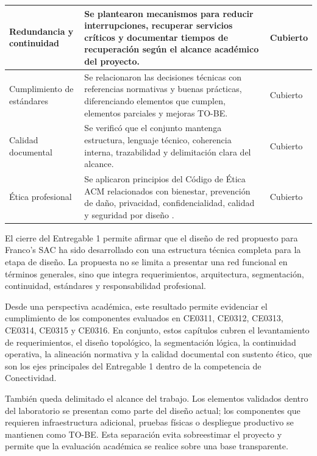 \documentclass[11pt, a4paper, oneside]{report}
\begin{document}
\begin{xltabular}{\textwidth}{@{}|L{3.5cm}|X|L{2.4cm}|@{}}
{\small Redundancia y continuidad} &
{\small Se plantearon mecanismos para reducir interrupciones, recuperar servicios críticos y documentar tiempos de recuperación según el alcance académico del proyecto.} &
{\small Cubierto} \\ \hline

{\small Cumplimiento de estándares} &
{\small Se relacionaron las decisiones técnicas con referencias normativas y buenas prácticas, diferenciando elementos que cumplen, elementos parciales y mejoras TO-BE.} &
{\small Cubierto} \\ \hline

{\small Calidad documental} &
{\small Se verificó que el conjunto mantenga estructura, lenguaje técnico, coherencia interna, trazabilidad y delimitación clara del alcance.} &
{\small Cubierto} \\ \hline

{\small Ética profesional} &
{\small Se aplicaron principios del Código de Ética ACM relacionados con bienestar, prevención de daño, privacidad, confidencialidad, calidad y seguridad por diseño \cite{acmcode}.} &
{\small Cubierto} \\ \hline

\end{xltabular}

\normalsize

El cierre del Entregable 1 permite afirmar que el diseño de red propuesto para Franco's SAC ha sido desarrollado con una estructura técnica completa para la etapa de diseño. La propuesta no se limita a presentar una red funcional en términos generales, sino que integra requerimientos, arquitectura, segmentación, continuidad, estándares y responsabilidad profesional.

Desde una perspectiva académica, este resultado permite evidenciar el cumplimiento de los componentes evaluados en CE0311, CE0312, CE0313, CE0314, CE0315 y CE0316. En conjunto, estos capítulos cubren el levantamiento de requerimientos, el diseño topológico, la segmentación lógica, la continuidad operativa, la alineación normativa y la calidad documental con sustento ético, que son los ejes principales del Entregable 1 dentro de la competencia de Conectividad.

También queda delimitado el alcance del trabajo. Los elementos validados dentro del laboratorio se presentan como parte del diseño actual; los componentes que requieren infraestructura adicional, pruebas físicas o despliegue productivo se mantienen como TO-BE. Esta separación evita sobreestimar el proyecto y permite que la evaluación académica se realice sobre una base transparente.
\end{document}
